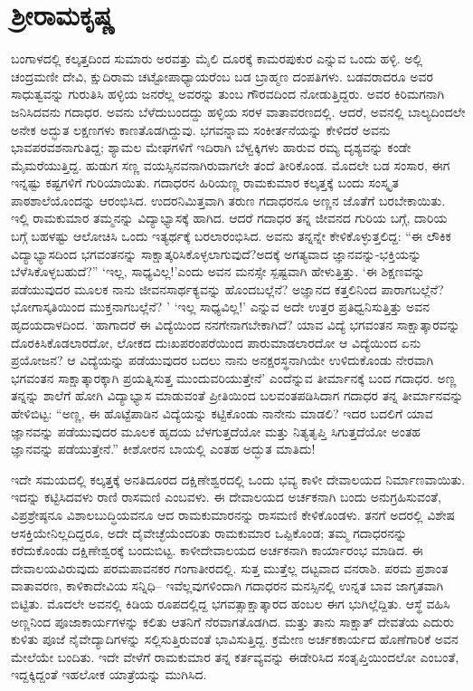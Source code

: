 
\chapter{ಶ್ರೀರಾಮಕೃಷ್ಣ}

ಬಂಗಾಳದಲ್ಲಿ ಕಲ್ಕತ್ತದಿಂದ ಸುಮಾರು ಅರವತ್ತು ಮೈಲಿ ದೂರಕ್ಕೆ ಕಾಮರಪುಕುರ ಎನ್ನುವ ಒಂದು ಹಳ್ಳಿ. ಅಲ್ಲಿ ಚಂದ್ರಮಣೀ ದೇವಿ, ಕ್ಷುದಿರಾಮ ಚಟ್ಟೋಪಾಧ್ಯಾಯರೆಂಬ ಬಡ ಬ್ರಾಹ್ಮಣ ದಂಪತಿಗಳು. ಬಡವರಾದರೂ ಅವರ ಸಾಧುತ್ವವನ್ನು ಗುರುತಿಸಿ ಹಳ್ಳಿಯ ಜನರೆಲ್ಲ ಅವರನ್ನು ತುಂಬ ಗೌರವದಿಂದ ನೋಡುತ್ತಿದ್ದರು. ಅವರ ಕಿರಿಮಗನಾಗಿ ಜನಿಸಿದವನು ಗದಾಧರ. ಅವನು ಬೆಳೆದುಬಂದದ್ದು ಹಳ್ಳಿಯ ಸರಳ ವಾತಾವರಣದಲ್ಲಿ. ಆದರೆ, ಅವನಲ್ಲಿ ಬಾಲ್ಯದಿಂದಲೇ ಅನೇಕ ಅದ್ಭುತ ಲಕ್ಷಣಗಳು ಕಾಣತೊಡಗಿದ್ದುವು. ಭಗವನ್ನಾಮ ಸಂಕೀರ್ತನೆಯನ್ನು ಕೇಳಿದರೆ ಅವನು ಭಾವಪರವಶನಾಗುತಿದ್ದ; ಶ್ಯಾಮಲ ಮೇಘಗಳಿಗೆ ಇದಿರಾಗಿ ಬೆಳ್ವಕ್ಕಿಗಳು ಹಾರುವ ರಮ್ಯ ದೃಶ್ಯವನ್ನು ಕಂಡೇ ಮೈಮರೆಯುತ್ತಿದ್ದ. ಹುಡುಗ ಸಣ್ಣ ವಯಸ್ಸಿನವನಾಗಿರುವಾಗಲೇ ತಂದೆ ತೀರಿಕೊಂಡ. ಮೊದಲೇ ಬಡ ಸಂಸಾರ, ಈಗ ಇನ್ನಷ್ಟು ಕಷ್ಟಗಳಿಗೆ ಗುರಿಯಾಯಿತು. ಗದಾಧರನ ಹಿರಿಯಣ್ಣ ರಾಮಕುಮಾರ ಕಲ್ಕತ್ತಕ್ಕೆ ಬಂದು ಸಂಸ್ಕೃತ ಪಾಠಶಾಲೆಯೊಂದನ್ನು ಆರಂಭಿಸಿದ. ಉದರನಿಮಿತ್ತವಾಗಿ ತರುಣ ಗದಾಧರನೂ ಅಣ್ಣನ ಜೊತೆಗೆ ಬರಬೇಕಾಯಿತು. ಇಲ್ಲಿ ರಾಮಕುಮಾರ ತಮ್ಮನನ್ನು ವಿದ್ಯಾಭ್ಯಾಸಕ್ಕೆ ಹಾಗಿದ. ಆದರೆ ಗದಾಧರ ತನ್ನ ಜೀವನದ ಗುರಿಯ ಬಗ್ಗೆ, ದಾರಿಯ ಬಗ್ಗೆ ಬಹಳಷ್ಟು ಆಲೋಚಿಸಿ ಒಂದು ಇತ್ಯರ್ಥಕ್ಕೆ ಬರಲಾರಂಭಿಸಿದ. ಅವನು ತನ್ನನ್ನೇ ಕೇಳಿಕೊಳ್ಳುತ್ತಲಿದ್ದ: “ಈ ಲೌಕಿಕ ವಿದ್ಯಾಭ್ಯಾಸದಿಂದ ಭಗವಂತನನ್ನು ಸಾಕ್ಷಾತ್ಕರಿಸಿಕೊಳ್ಳಲಾಗುವುದೆ?ಅದಕ್ಕೆ ಅಗತ್ಯವಾದ ಜ್ಞಾನವನ್ನು-ಭಕ್ತಿಯನ್ನು ಬೆಳೆಸಿಕೊಳ್ಳಬಹುದೆ?” ‘ಇಲ್ಲ, ಸಾಧ್ಯವಿಲ್ಲ!’ಎಂದು ಅವನ ಮನಸ್ಸೇ ಸ್ಪಷ್ಟವಾಗಿ ಹೇಳುತ್ತಿತ್ತು. ‘ಈ ಶಿಕ್ಷಣವನ್ನು ಪಡೆಯುವುದರ ಮೂಲಕ ನಾನು ಜೀವನಸಾರ್ಥಕ್ಯವನ್ನು ಹೊಂದಬಲ್ಲೆನೆ? ಅಜ್ಞಾನದ ಕತ್ತಲಿನಿಂದ ಪಾರಾಗಬಲ್ಲೆನೆ? ಭೋಗಾಸ್ಕತಿಯಿಂದ ಮುಕ್ತನಾಗಬಲ್ಲೆನೆ? ’ ‘ಇಲ್ಲ ಸಾಧ್ಯವಿಲ್ಲ!’ ಎನ್ನುವ ಅದೇ ಉತ್ತರ ಪ್ರತಿಧ್ವನಿಸುತ್ತಿತ್ತು ಅವನ ಹೃದಯದಾಳದಿಂದ. ‘ಹಾಗಾದರೆ ಈ ವಿದ್ಯೆಯಿಂದ ನನಗೇನಾಗಬೇಕಾಗಿದೆ? ಯಾವ ವಿದ್ಯೆ ಭಗವಂತನ ಸಾಕ್ಷಾತ್ಕಾರವನ್ನು ದೊರಕಿಸಿಕೊಡಲಾರದೋ, ಲೋಕದ ದುಃಖಪರಂಪರೆಯಿಂದ ಪಾರುಮಾಡಲಾರದೋ ಆ ವಿದ್ಯೆಯಿಂದ ಏನು ಪ್ರಯೋಜನ? ಆ ವಿದ್ಯೆಯನ್ನು ಪಡೆಯುವುದರ ಬದಲು ನಾನು ಅನಕ್ಷರಸ್ಥನಾಗಿಯೇ ಉಳಿದುಕೊಂಡು ನೇರವಾಗಿ ಭಗವಂತನ ಸಾಕ್ಷಾತ್ಕಾರಕ್ಕಾಗಿ ಪ್ರಯತ್ನಿಸುತ್ತ ಮುಂದುವರಿಯುತ್ತೇನೆ’ ಎಂದೆನ್ನುವ ತೀರ್ಮಾನಕ್ಕೆ ಬಂದ ಗದಾಧರ. ಅಣ್ಣ ತನ್ನನ್ನು ಶಾಲೆಗೆ ಹೋಗಿ ವಿದ್ಯಾಭ್ಯಾಸ ಮಾಡುವಂತೆ ಪ್ರೀತಿಯಿಂದ ಬಲವಂತಪಡಿಸಿದಾಗ ಗದಾಧರ ತನ್ನ ತೀರ್ಮಾನವನ್ನು ಹೇಳಿಬಿಟ್ಟ: “ಅಣ್ಣ, ಈ ಹೊಟ್ಟೆಪಾಡಿನ ವಿದ್ಯೆಯನ್ನು ಕಟ್ಟಿಕೊಂಡು ನಾನೇನು ಮಾಡಲಿ? ಇದರ ಬದಲಿಗೆ ಯಾವ ಜ್ಞಾನವನ್ನು ಪಡೆಯುವುದರ ಮೂಲಕ ಹೃದಯ ಬೆಳಗುತ್ತದೆಯೋ ಮತ್ತು ನಿತ್ಯತೃಪ್ತಿ ಸಿಗುತ್ತದೆಯೋ ಅಂತಹ ಜ್ಞಾನವನ್ನು ಪಡೆಯುತ್ತೇನೆ.” ಕೀಶೋರನ ಬಾಯಲ್ಲಿ ಎಂತಹ ಅದ್ಭುತ ಮಾತಿದು! 

ಇದೇ ಸಮಯದಲ್ಲಿ ಕಲ್ಕತ್ತಕ್ಕೆ ಅನತಿದೂರದ ದಕ್ಷಿಣೇಶ್ವರದಲ್ಲಿ ಒಂದು ಭವ್ಯ ಕಾಳೀ ದೇವಾಲಯದ ನಿರ್ಮಾಣವಾಯಿತು. ಇದನ್ನು ಕಟ್ಟಿಸಿದವಳು ರಾಣಿ ರಾಸಮಣಿ ಎಂಬವಳು. ಈ ದೇವಾಲಯದ ಅರ್ಚಕನಾಗಿ ಬಂದು ಅನುಗ್ರಹಿಸುವಂತೆ, ವಿಪ್ರಶ್ರೇಷ್ಠನೂ ವಿಶಾಲಬುದ್ಧಿಯವನೂ ಆದ ರಾಮಕುಮಾರನನ್ನು ರಾಸಮಣಿ ಕೇಳಿಕೊಂಡಳು. ತನಗೆ ಅದರಲ್ಲಿ ವಿಶೇಷ ಆಸಕ್ತಿಯೇನಿಲ್ಲದಿದ್ದರೂ, ಅದೇ ದೈವೇಚ್ಛೆಯೆಂದರಿತು ರಾಮಕುಮಾರ ಒಪ್ಪಿಕೊಂಡ; ತಮ್ಮ ಗದಾಧರನನ್ನು ಕರೆದುಕೊಂಡು ದಕ್ಷಿಣೇಶ್ವರಕ್ಕೆ ಬಂದುಬಿಟ್ಟ. ಕಾಳೀದೇವಾಲಯದ ಅರ್ಚಕನಾಗಿ ಕಾರ್ಯಾರಂಭ ಮಾಡಿದ. ಈ ದೇವಾಲಯವಿರುವುದು ಪರಮಪಾವನಕರ ಗಂಗಾತೀರದಲ್ಲಿ. ಸುತ್ತ ಮುತ್ತೆಲ್ಲ ದಟ್ಟವಾದ ವನರಾಶಿ. ಪರಮ ಪ್ರಶಾಂತ ವಾತಾವರಣ, ಕಾಳಿಕಾದೇವಿಯ ಸನ್ನಿಧಿ– ಇವೆಲ್ಲವುಗಳಿಂದಾಗಿ ಗದಾಧರನ ಮನಸ್ಸಿನಲ್ಲಿ ಉನ್ನತ ಬಾವ ಜಾಗೃತವಾಗಿ ಬಿಟ್ಟಿತು. ಮೊದಲೇ ಅವನಲ್ಲಿ ಕಿಡಿಯ ರೂಪದಲ್ಲಿದ್ದ ಭಗವತ್ಸಾಕ್ಷಾತ್ಕಾರದ ಹಂಬಲ ಈಗ ಭುಗಿಲ್ಲೆದ್ದಿತು. ಆಸ್ಥೆ ವಹಿಸಿ ಅಣ್ಣನಿಂದ ಪೂಜಾಕಾರ್ಯಗಳನ್ನು ಕಲಿತು ಆತನಿಗೆ ನೆರವಾಗತೊಡಗಿದ. ಮತ್ತು ತಾನು ಸಾಕ್ಷಾತ್ ದೇವತೆಯ ಎದುರು ಕುಳಿತು ಪೂಜೆ ನೈವೇದ್ಯಾದಿಗಳನ್ನು ಸಲ್ಲಿಸುತ್ತಿರುವಂತೆ ಭಾವಿಸುತ್ತಿದ್ದ. ಕ್ರಮೇಣ ಅರ್ಚಕಕಾರ್ಯದ ಹೊಣೆಗಾರಿಕೆ ಅವನ ಮೇಲೆಯೇ ಬಂದಿತು. ಇದೇ ವೇಳೆಗೆ ರಾಮಕುಮಾರ ತನ್ನ ಕರ್ತವ್ಯವನ್ನು ಈಡೇರಿಸಿದ ಸಂತೃಪ್ತಿಯಿಂದಲೋ ಎಂಬಂತೆ, ಇದ್ದಕ್ಕಿದ್ದಂತೆ ಇಹಲೋಕ ಯಾತ್ರೆಯನ್ನು ಮುಗಿಸಿದ.

